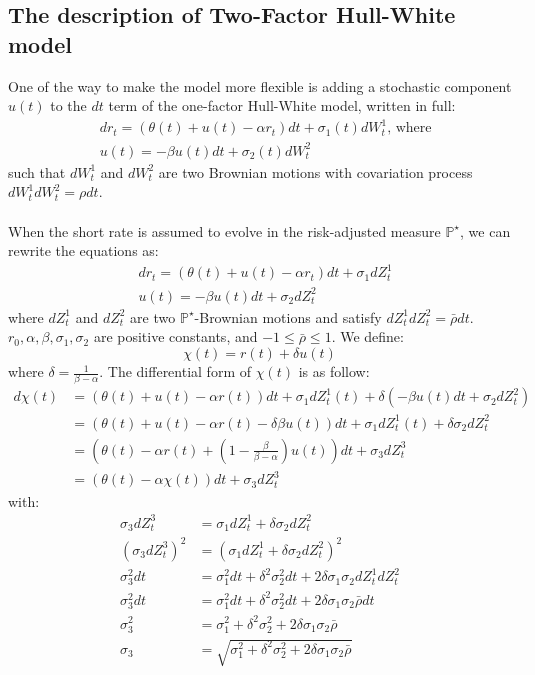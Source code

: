 \documentclass[11pt]{article}
\begin{document}
\subsection{The description of Two-Factor Hull-White model
}
One of the way to make the model more flexible is adding a stochastic component $u(t)$ to the $dt$ term of the one-factor Hull-White model, written in full:
\begin{align*}
& dr_t = (\theta(t) + u(t) - \alpha r_t)dt + \sigma_{1}(t)dW_{t}^{1} \text{, where} \\
& u(t) = -\beta u(t)dt + \sigma_{2}(t)dW_{t}^{2}
\end{align*}
such that $dW_{t}^{1}$ and $dW_{t}^{2}$ are two Brownian motions with covariation process $dW_{t}^{1}dW_{t}^{2} = \rho dt$. \\
\\
When the short rate is assumed to evolve in the risk-adjusted measure $\mathbb{P}^{\star}$, we can rewrite the equations as:
\begin{align*}
& dr_t = (\theta(t) + u(t) - \alpha r_t)dt + \sigma_{1}dZ_{t}^{1}  \\
& u(t) = -\beta u(t)dt + \sigma_{2}dZ_{t}^{2}
\end{align*}
where $dZ_{t}^{1}$ and $dZ_{t}^{2}$ are two $\mathbb{P}^{\star}$-Brownian motions and satisfy $dZ_{t}^{1}dZ_{t}^{2} = \bar{\rho} dt$.
$r_{0}, \alpha, \beta, \sigma_{1}, \sigma_{2}$ are positive constants, and $-1 \le \bar{\rho} \le 1$. We define:
\[
\chi (t) = r(t) + \delta u(t)
\]
where $\delta = \frac{1}{\beta - \alpha}$. The differential form of $\chi (t)$ is as follow:
\begin{align*}
d\chi(t) &= (\theta(t) + u(t) - \alpha r(t))dt + \sigma_{1}dZ_{t}^{1}(t) + \delta (-\beta u(t)dt + \sigma_{2}dZ_{t}^{2}) \\
&= (\theta(t) + u(t) - \alpha r(t) - \delta \beta u(t))dt + \sigma_{1}dZ_{t}^{1}(t) + \delta \sigma_{2}dZ_{t}^{2} \\
&= \left(\theta(t) - \alpha r(t) + \left(1 - \frac{\beta}{\beta - \alpha} \right)u(t) \right)dt + \sigma_{3}dZ_{t}^{3} \\
&= (\theta(t) - \alpha \chi(t) )dt + \sigma_{3}dZ_{t}^{3}
\end{align*}
with:
\begin{align*}
\sigma_{3}dZ_{t}^{3} &= \sigma_{1}dZ_{t}^{1} + \delta\sigma_{2}dZ_{t}^{2} \\
(\sigma_{3}dZ_{t}^{3})^{2} &= (\sigma_{1}dZ_{t}^{1} + \delta\sigma_{2}dZ_{t}^{2})^{2} \\
\sigma_{3}^{2}dt &= \sigma_{1}^{2}dt + \delta^{2}\sigma_{2}^{2}dt + 2\delta\sigma_{1}\sigma_{2}dZ_{t}^{1}dZ_{t}^{2} \\
\sigma_{3}^{2}dt  &=  \sigma_{1}^{2}dt + \delta^{2}\sigma_{2}^{2}dt + 2\delta\sigma_{1}\sigma_{2}\bar{\rho} dt \\
\sigma_{3}^{2}  &= \sigma_{1}^{2} + \delta^{2}\sigma_{2}^{2} + 2\delta\sigma_{1}\sigma_{2}\bar{\rho} \\
\sigma_{3}  &= \sqrt{\sigma_{1}^{2} + \delta^{2}\sigma_{2}^{2} + 2\delta\sigma_{1}\sigma_{2}\bar{\rho}} \\
\end{align*}
\end{document}
